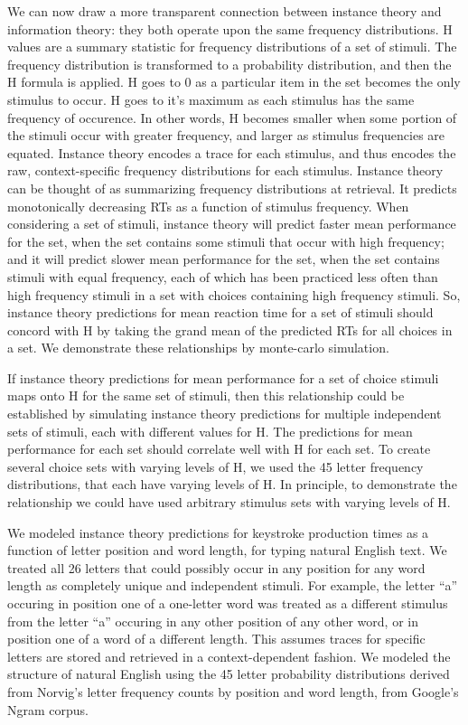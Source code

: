 \documentclass[,man,floatsintext]{apa6}
\begin{document}
We can now draw a more transparent connection between instance theory and information theory: they both operate upon the same frequency distributions. H values are a summary statistic for frequency distributions of a set of stimuli. The frequency distribution is transformed to a probability distribution, and then the H formula is applied. H goes to 0 as a particular item in the set becomes the only stimulus to occur. H goes to it's maximum as each stimulus has the same frequency of occurence. In other words, H becomes smaller when some portion of the stimuli occur with greater frequency, and larger as stimulus frequencies are equated. Instance theory encodes a trace for each stimulus, and thus encodes the raw, context-specific frequency distributions for each stimulus. Instance theory can be thought of as summarizing frequency distributions at retrieval. It predicts monotonically decreasing RTs as a function of stimulus frequency. When considering a set of stimuli, instance theory will predict faster mean performance for the set, when the set contains some stimuli that occur with high frequency; and it will predict slower mean performance for the set, when the set contains stimuli with equal frequency, each of which has been practiced less often than high frequency stimuli in a set with choices containing high frequency stimuli. So, instance theory predictions for mean reaction time for a set of stimuli should concord with H by taking the grand mean of the predicted RTs for all choices in a set. We demonstrate these relationships by monte-carlo simulation.

If instance theory predictions for mean performance for a set of choice stimuli maps onto H for the same set of stimuli, then this relationship could be established by simulating instance theory predictions for multiple independent sets of stimuli, each with different values for H. The predictions for mean performance for each set should correlate well with H for each set. To create several choice sets with varying levels of H, we used the 45 letter frequency distributions, that each have varying levels of H. In principle, to demonstrate the relationship we could have used arbitrary stimulus sets with varying levels of H.

We modeled instance theory predictions for keystroke production times as a function of letter position and word length, for typing natural English text. We treated all 26 letters that could possibly occur in any position for any word length as completely unique and independent stimuli. For example, the letter \enquote{a} occuring in position one of a one-letter word was treated as a different stimulus from the letter \enquote{a} occuring in any other position of any other word, or in position one of a word of a different length. This assumes traces for specific letters are stored and retrieved in a context-dependent fashion. We modeled the structure of natural English using the 45 letter probability distributions derived from Norvig's letter frequency counts by position and word length, from Google's Ngram corpus.
\end{document}
